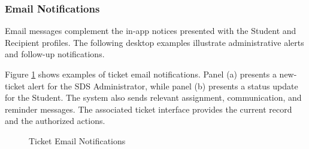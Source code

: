 \FloatBarrier
\subsubsection{Email Notifications}

Email messages complement the in-app notices presented with the Student and Recipient profiles. The following desktop examples illustrate administrative alerts and follow-up notifications.

Figure \ref{fig:mail} shows examples of ticket email notifications. Panel (a) presents a new-ticket alert for the SDS Administrator, while panel (b) presents a status update for the Student. The system also sends relevant assignment, communication, and reminder messages. The associated ticket interface provides the current record and the authorized actions.

\renewcommand{\thefigure}{5.40}
\begin{figure}[htbp]
    \centering
    \par{}\par
    \medskip
    \par{}\par
    \caption{Ticket Email Notifications}
    \label{fig:mail}
\end{figure}
\FloatBarrier

